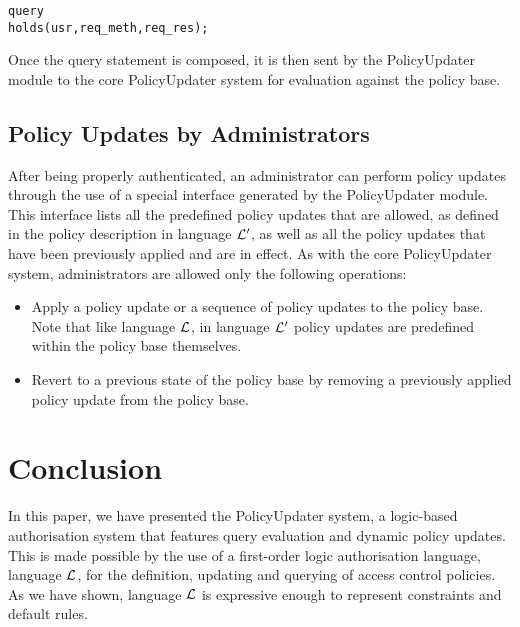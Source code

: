 \documentclass[global,twocolumn,draft]{svjour}
\newenvironment{vverbatim}
  {\begin{alltt}}
  {\vspace{-\baselineskip}\end{alltt}}
\begin{document}
      \begin{vverbatim}
  query
    holds(usr, req\_meth, req\_res);
      \end{vverbatim}

      Once the query statement is composed, it is then sent by the
      PolicyUpdater module to the core PolicyUpdater system for evaluation
      against the policy base.

    \subsection{Policy Updates by Administrators}

      After being properly authenticated, an administrator can perform policy
      updates through the use of a special interface generated by the
      PolicyUpdater module. This interface lists all the predefined policy
      updates that are allowed, as defined in the policy description in
      language ${\cal L'}$, as well as all the policy updates that have been
      previously applied and are in effect. As with the core PolicyUpdater
      system, administrators are allowed only the following operations:

      \begin{itemize}
        \item
          Apply a policy update or a sequence of policy updates to the policy
          base. Note that like language ${\cal L}$, in language ${\cal L'}$
          policy updates are predefined within the policy base themselves.
        \item
          Revert to a previous state of the policy base by removing a
          previously applied policy update from the policy base.
      \end{itemize}

  \section{Conclusion}
    \label{sec-conclusion}

    In this paper, we have presented the PolicyUpdater system, a logic-based
    authorisation system that features query evaluation and dynamic policy
    updates. This is made possible by the use of a first-order logic
    authorisation language, language ${\cal L}$, for the definition, updating
    and querying of access control policies. As we have shown, language
    ${\cal L}$ is expressive enough to represent constraints and default rules.
\end{document}
